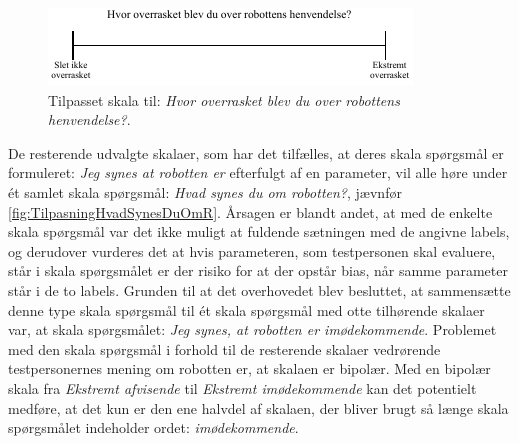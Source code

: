 %
\begin{figure}[H]
\centering
\includegraphics[width =\textwidth]{Figure/TilpasningAfSkalaer/TilpassetOverrasketOverR} 
\caption{Tilpasset skala til: \textit{Hvor overrasket blev du over robottens henvendelse?}.}
\label{fig:TilpasningOverrasketOverR}
\end{figure}
\noindent
%  
De resterende udvalgte skalaer, som har det tilfælles, at deres skala spørgsmål er formuleret: \textit{Jeg synes at robotten er} efterfulgt af en parameter, vil alle høre under ét samlet skala spørgsmål: \textit{Hvad synes du om robotten?}, jævnfør \autoref{fig:TilpasningHvadSynesDuOmR}. Årsagen er blandt andet, at med de enkelte skala spørgsmål var det ikke muligt at fuldende sætningen med de angivne labels, og derudover vurderes det at hvis parameteren, som testpersonen skal evaluere, står i skala spørgsmålet er der risiko for at der opstår bias, når samme parameter står i de to labels. Grunden til at det overhovedet blev besluttet, at sammensætte denne type skala spørgsmål til ét skala spørgsmål med otte tilhørende skalaer var, at skala spørgsmålet: \textit{Jeg synes, at robotten er imødekommende}. Problemet med den skala spørgsmål i forhold til de resterende skalaer vedrørende testpersonernes mening om robotten er, at skalaen er bipolær. Med en bipolær skala fra \textit{Ekstremt afvisende} til \textit{Ekstremt imødekommende} kan det potentielt medføre, at det kun er den ene halvdel af skalaen, der bliver brugt så længe skala spørgsmålet indeholder ordet: \textit{imødekommende}. 

